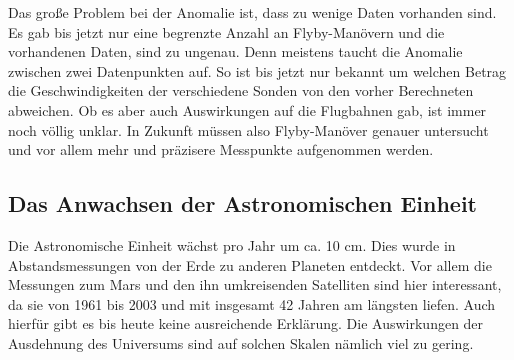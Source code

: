 
\bigskip

Das gro{\ss}e Problem bei der Anomalie ist, dass zu wenige Daten
vorhanden sind. Es gab bis jetzt nur eine begrenzte Anzahl an
Flyby-Man\"overn und die vorhandenen Daten, sind zu ungenau. Denn
meistens taucht die Anomalie zwischen zwei Datenpunkten auf. So ist bis
jetzt nur bekannt um welchen Betrag die Geschwindigkeiten der
verschiedene Sonden von den vorher Berechneten abweichen. Ob es aber
auch Auswirkungen auf die Flugbahnen gab, ist immer noch v\"ollig
unklar. In Zukunft m\"ussen also Flyby-Man\"over genauer untersucht und
vor allem mehr und pr\"azisere Messpunkte aufgenommen werden.

\subsection{Das Anwachsen der Astronomischen Einheit}


Die Astronomische Einheit w\"achst pro Jahr um ca. 10 cm. Dies wurde in
Abstandsmessungen von der Erde zu anderen Planeten entdeckt. Vor allem
die Messungen zum Mars und den ihn umkreisenden Satelliten sind hier
interessant, da sie von 1961 bis 2003 und mit insgesamt 42 Jahren am
l\"angsten liefen. Auch hierf\"ur gibt es bis heute keine ausreichende
Erkl\"arung. Die Auswirkungen der Ausdehnung des Universums sind auf
solchen Skalen n\"amlich viel zu gering.
